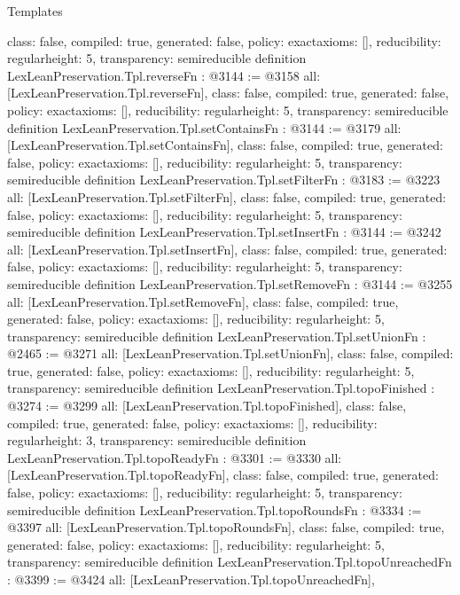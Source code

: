 \begin{lexlean}{Templates}
\begin{coremodule}
{  class: false,
  compiled: true,
  generated: false,
  policy: exact{axioms: []},
  reducibility: regular{height: 5},
  transparency: semireducible
}
definition LexLeanPreservation.Tpl.reverseFn : @3144 := @3158 {
  all: [LexLeanPreservation.Tpl.reverseFn],
  class: false,
  compiled: true,
  generated: false,
  policy: exact{axioms: []},
  reducibility: regular{height: 5},
  transparency: semireducible
}
definition LexLeanPreservation.Tpl.setContainsFn : @3144 := @3179 {
  all: [LexLeanPreservation.Tpl.setContainsFn],
  class: false,
  compiled: true,
  generated: false,
  policy: exact{axioms: []},
  reducibility: regular{height: 5},
  transparency: semireducible
}
definition LexLeanPreservation.Tpl.setFilterFn : @3183 := @3223 {
  all: [LexLeanPreservation.Tpl.setFilterFn],
  class: false,
  compiled: true,
  generated: false,
  policy: exact{axioms: []},
  reducibility: regular{height: 5},
  transparency: semireducible
}
definition LexLeanPreservation.Tpl.setInsertFn : @3144 := @3242 {
  all: [LexLeanPreservation.Tpl.setInsertFn],
  class: false,
  compiled: true,
  generated: false,
  policy: exact{axioms: []},
  reducibility: regular{height: 5},
  transparency: semireducible
}
definition LexLeanPreservation.Tpl.setRemoveFn : @3144 := @3255 {
  all: [LexLeanPreservation.Tpl.setRemoveFn],
  class: false,
  compiled: true,
  generated: false,
  policy: exact{axioms: []},
  reducibility: regular{height: 5},
  transparency: semireducible
}
definition LexLeanPreservation.Tpl.setUnionFn : @2465 := @3271 {
  all: [LexLeanPreservation.Tpl.setUnionFn],
  class: false,
  compiled: true,
  generated: false,
  policy: exact{axioms: []},
  reducibility: regular{height: 5},
  transparency: semireducible
}
definition LexLeanPreservation.Tpl.topoFinished : @3274 := @3299 {
  all: [LexLeanPreservation.Tpl.topoFinished],
  class: false,
  compiled: true,
  generated: false,
  policy: exact{axioms: []},
  reducibility: regular{height: 3},
  transparency: semireducible
}
definition LexLeanPreservation.Tpl.topoReadyFn : @3301 := @3330 {
  all: [LexLeanPreservation.Tpl.topoReadyFn],
  class: false,
  compiled: true,
  generated: false,
  policy: exact{axioms: []},
  reducibility: regular{height: 5},
  transparency: semireducible
}
definition LexLeanPreservation.Tpl.topoRoundsFn : @3334 := @3397 {
  all: [LexLeanPreservation.Tpl.topoRoundsFn],
  class: false,
  compiled: true,
  generated: false,
  policy: exact{axioms: []},
  reducibility: regular{height: 5},
  transparency: semireducible
}
definition LexLeanPreservation.Tpl.topoUnreachedFn : @3399 := @3424 {
  all: [LexLeanPreservation.Tpl.topoUnreachedFn],
}
\end{coremodule}
\end{lexlean}
